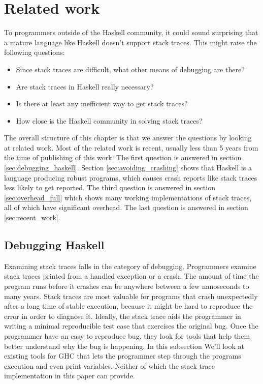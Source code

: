 \chapter{Related work}

To programmers outside of the Haskell community, it could sound
surprising that a mature language like Haskell doesn't support stack
traces. This might raise the following questions:

\begin{itemize}
  \itemsep1pt\parskip0pt
  \item
    Since stack traces are difficult, what other means of debugging are
    there?
  \item
    Are stack traces in Haskell really necessary?
  \item
    Is there at least any inefficient way to get stack traces?
  \item
    How close is the Haskell community in solving stack traces?
\end{itemize}

The overall structure of this chapter is that we answer the questions
by looking at related work. Most of the
related work is recent, usually less than 5 years from the time of
publishing of this work. The first question is answered in section
\ref{sec:debugging_haskell}. Section \ref{sec:avoiding_crashing}
shows that Haskell is a language producing robust programs, which causes
crash reports like stack traces less likely to get reported.
The third question is answered in section
\ref{sec:overhead_full} which shows many working implementations of
stack traces, all of which have significant overhead. The last question
is answered in section \ref{sec:recent_work}.

\section{Debugging Haskell} \label{ sec:debugging_haskell }

Examining stack traces falls in the category of debugging. Programmers
examine stack traces printed from a handled exception or a
crash. The amount of time the program runs before it crashes can be
anywhere between a few nanoseconds to many years. Stack traces are most
valuable for programs that crash unexpectedly after a long time of
stable execution, because it might be hard to reproduce the error in
order to diagnose it. Ideally, the stack trace aids the programmer in
writing a minimal reproducible test case that exercises the original
bug. Once the programmer have an easy to reproduce bug, they look for
tools that help them better understand why the bug is happening. In this
subsection We'll look at existing tools for GHC that lets the programmer
step through the programs execution and even print variables. Neither of
which the stack trace implementation in this paper can provide.

